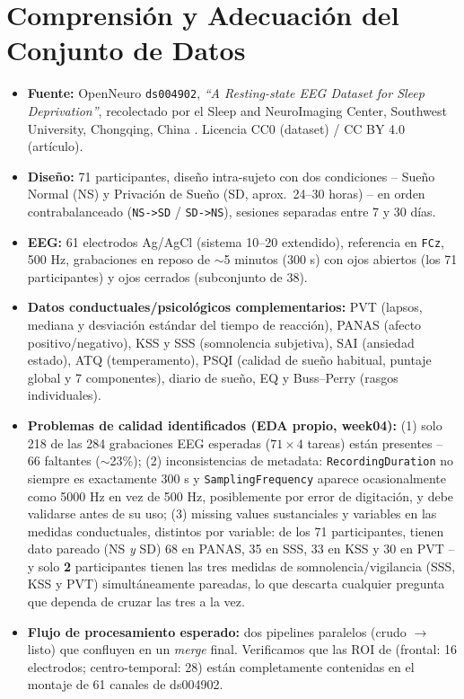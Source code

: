 \documentclass[10pt]{article}
\begin{document}
\section{Comprensión y Adecuación del Conjunto de Datos}
{\small
\begin{itemize}
    \item \textbf{Fuente:} OpenNeuro \texttt{ds004902}, \emph{``A Resting-state EEG Dataset for Sleep Deprivation''}, recolectado por el Sleep and NeuroImaging Center, Southwest University, Chongqing, China \citep{xiang2024}. Licencia CC0 (dataset) / CC BY 4.0 (artículo).
    \item \textbf{Diseño:} 71 participantes, diseño intra-sujeto con dos condiciones -- Sueño Normal (NS) y Privación de Sueño (SD, aprox.\ 24--30 horas) -- en orden contrabalanceado (\texttt{NS->SD} / \texttt{SD->NS}), sesiones separadas entre 7 y 30 días.
    \item \textbf{EEG:} 61 electrodos Ag/AgCl (sistema 10--20 extendido), referencia en \texttt{FCz}, 500 Hz, grabaciones en reposo de $\sim$5 minutos (300 s) con ojos abiertos (los 71 participantes) y ojos cerrados (subconjunto de 38).
    \item \textbf{Datos conductuales/psicológicos complementarios:} PVT (lapsos, mediana y desviación estándar del tiempo de reacción), PANAS (afecto positivo/negativo), KSS y SSS (somnolencia subjetiva), SAI (ansiedad estado), ATQ (temperamento), PSQI (calidad de sueño habitual, puntaje global y 7 componentes), diario de sueño, EQ y Buss--Perry (rasgos individuales).
    \item \textbf{Problemas de calidad identificados (EDA propio, week04):} (1) solo 218 de las 284 grabaciones EEG esperadas ($71 \times 4$ tareas) están presentes -- 66 faltantes ($\sim$23\%); (2) inconsistencias de metadata: \texttt{RecordingDuration} no siempre es exactamente 300 s y \texttt{SamplingFrequency} aparece ocasionalmente como 5000 Hz en vez de 500 Hz, posiblemente por error de digitación, y debe validarse antes de su uso; (3) missing values sustanciales y variables en las medidas conductuales, distintos por variable: de los 71 participantes, tienen dato pareado (NS \emph{y} SD) 68 en PANAS, 35 en SSS, 33 en KSS y 30 en PVT -- y solo \textbf{2} participantes tienen las tres medidas de somnolencia/vigilancia (SSS, KSS y PVT) simultáneamente pareadas, lo que descarta cualquier pregunta que dependa de cruzar las tres a la vez.
    \item \textbf{Flujo de procesamiento esperado:} dos pipelines paralelos (crudo $\rightarrow$ listo) que confluyen en un \emph{merge} final. Verificamos que las ROI de \citet{cui2026} (frontal: 16 electrodos; centro-temporal: 28) están completamente contenidas en el montaje de 61 canales de ds004902.

\end{itemize}}
\end{document}

